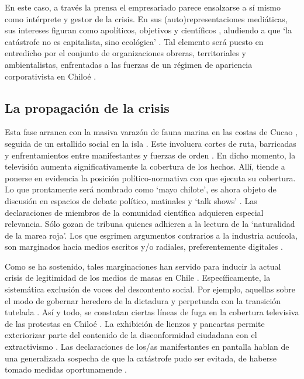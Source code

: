 \documentclass{textolivre}
\begin{document}
En este caso, a través la prensa el empresariado parece ensalzarse a sí mismo
como intérprete y gestor de la crisis. En sus (auto)representaciones mediáticas, sus
intereses figuran como apolíticos, objetivos y científicos \cite{mosco2016},
aludiendo a que ‘la catástrofe no es capitalista, sino ecológica’ \cite{Foster2016,Gunderson2019}. 
Tal elemento será puesto en entredicho por el
conjunto de organizaciones obreras, territoriales y ambientalistas, enfrentadas a las
fuerzas de un régimen de apariencia corporativista en Chiloé \cite{Mascareo2018b,ValdebenitoAllendes2018}.


\subsection{La propagación de la crisis}\label{sec-prop-crisis}
Esta fase arranca con la masiva varazón de fauna marina en las costas de Cucao
\cite{Mascareo2018b}, seguida de un estallido social en la isla \cite{cabello2018,ValdebenitoAllendes2018}.
Este involucra cortes de ruta,
barricadas y enfrentamientos entre manifestantes y fuerzas de orden \cite{24horasa,t13a}. 
En dicho momento, la televisión aumenta significativamente la cobertura de
los hechos. Allí, tiende a ponerse en evidencia la posición político-normativa con que
ejecuta su cobertura. Lo que prontamente será nombrado como ‘mayo chilote’, es ahora
objeto de discusión en espacios de debate político, matinales y ‘talk shows’ \cite{cnnchile2016b}.
Las declaraciones de miembros de la comunidad científica adquieren especial
relevancia. Sólo gozan de tribuna quienes adhieren a la lectura de la ‘naturalidad de la
marea roja’. Los que esgrimen argumentos contrarios a la industria acuícola, son
marginados hacia medios escritos y/o radiales, preferentemente digitales \cite{ciudadano2016}.

Como se ha sostenido, tales marginaciones han servido para inducir la actual crisis
de legitimidad de los medios de masas en Chile \cite{newman2019,solimano}. 
Específicamente, la sistemática exclusión de voces del descontento social. Por
ejemplo, aquellas sobre el modo de gobernar heredero de la dictadura y perpetuada con
la transición tutelada \cite{palet,Santander2014,sapiezynska2013}.
Así y todo, se constatan ciertas líneas de fuga en la cobertura televisiva
de las protestas en Chiloé \cite{billi2017}. La exhibición de lienzos y
pancartas permite exteriorizar parte del contenido de la disconformidad ciudadana con el
extractivismo \cite{Gunderson2019}. Las declaraciones de los/as
manifestantes en pantalla hablan de una generalizada sospecha de que la catástrofe pudo
ser evitada, de haberse tomado medidas oportunamende \cite{24horasa,decima2016}.
\end{document}
